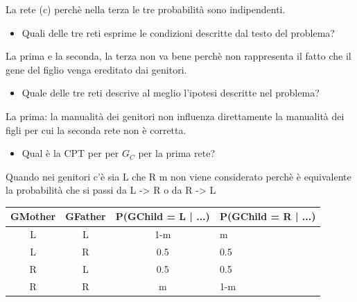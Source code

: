 \documentclass{article}
\begin{document}
La rete (c) perchè nella terza le tre probabilità sono indipendenti.

\begin{itemize}
	\item Quali delle tre reti esprime le condizioni descritte dal testo del problema?
\end{itemize}

La prima e la seconda, la terza non va bene perchè non rappresenta il fatto che il gene del figlio venga ereditato dai genitori.

\begin{itemize}
	\item Quale delle tre reti descrive al meglio l'ipotesi descritte nel problema?
\end{itemize}

	La prima: la manualità dei genitori non influenza direttamente la manualità dei figli per cui la seconda rete non è corretta.

\begin{itemize}
	\item Qual è la CPT per per \(G_C\) per la prima rete?
\end{itemize}
Quando nei genitori c'è sia L che R m non viene considerato perchè è equivalente la probabilità che si passi da L -> R o da R -> L \\

\begin{tabular}{|c|c|c|l|}
	\hline
	GMother & GFather & P(GChild = L | ...) & P(GChild  = R | ...) \\ \hline
	L       & L       & 1-m                 & m                    \\ \hline
	L       & R       & 0.5                 & 0.5                  \\ \hline
	R       & L       & 0.5                 & 0.5                  \\ \hline
	R       & R       & m                   & 1-m                  \\ \hline
\end{tabular}
\end{document}
